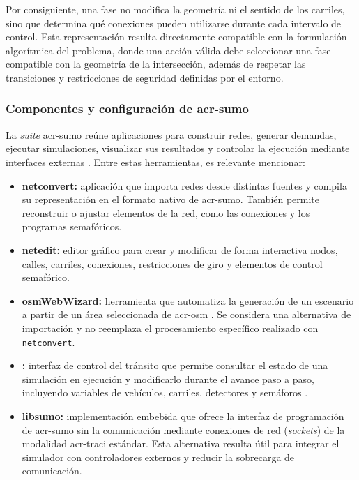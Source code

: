Por consiguiente, una \gls{fase} no modifica la geometría ni el sentido de los carriles, sino que determina qué conexiones pueden utilizarse durante cada intervalo de control. Esta representación resulta directamente compatible con la formulación algorítmica del problema, donde una acción válida debe seleccionar una fase compatible con la geometría de la intersección, además de respetar las transiciones y restricciones de seguridad definidas por el entorno.

\FloatBarrier
\subsubsection[Componentes y configuración de SUMO]{Componentes y configuración de \acrshort{acr-sumo}}

La \textit{suite} \acrshort{acr-sumo} reúne aplicaciones para construir redes, generar demandas, ejecutar simulaciones, visualizar sus resultados y controlar la ejecución mediante interfaces externas \cite{SUMO2026_SUMO}. Entre estas herramientas, es relevante mencionar:
\begin{itemize}
    \item \textbf{netconvert:} aplicación que importa redes desde distintas fuentes y compila su representación en el formato nativo de \acrshort{acr-sumo}. También permite reconstruir o ajustar elementos de la red, como las conexiones y los programas semafóricos.
    \item \textbf{netedit:} editor gráfico para crear y modificar de forma interactiva nodos, calles, carriles, conexiones, restricciones de giro y elementos de control semafórico.
    \item \textbf{osmWebWizard:} herramienta que automatiza la generación de un escenario a partir de un área seleccionada de \gls{acr-osm} \cite{OpenStreetMap}. Se considera una alternativa de importación y no reemplaza el procesamiento específico realizado con \texttt{netconvert}.
    \item \textbf{:} interfaz de control del tránsito que permite consultar el estado de una simulación en ejecución y modificarlo durante el avance paso a paso, incluyendo variables de vehículos, carriles, detectores y semáforos \cite{SUMO2026_SUMO}.
    \item \textbf{libsumo:} implementación embebida que ofrece la interfaz de programación de \acrshort{acr-sumo} sin la comunicación mediante conexiones de red (\textit{sockets}) de la modalidad \acrshort{acr-traci} estándar. Esta alternativa resulta útil para integrar el simulador con controladores externos y reducir la sobrecarga de comunicación.
\end{itemize}

